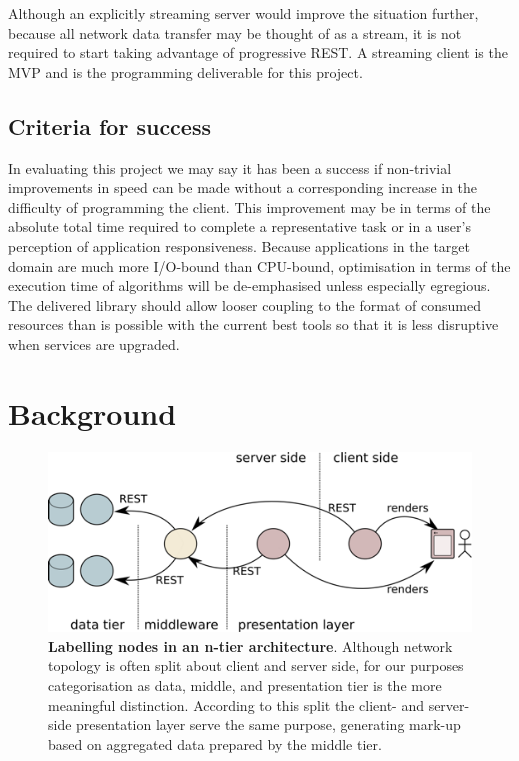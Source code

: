 \documentclass[12pt, ]{article}
\makeatletter
\let\stdsection\section
\renewcommand\section{\newpage\stdsection}
\def\maxwidth{\ifdim\Gin@nat@width>\linewidth\linewidth
\else\Gin@nat@width\fi}
\let\Oldincludegraphics\includegraphics
\renewcommand{\includegraphics}[1]{\Oldincludegraphics[width=\maxwidth]{#1}}
\makeatother
\begin{document}
Although an explicitly streaming server would improve the situation
further, because all network data transfer may be thought of as a
stream, it is not required to start taking advantage of progressive
REST. A streaming client is the MVP and is the programming deliverable
for this project.

\subsection{Criteria for success}\label{criteria-for-success}

In evaluating this project we may say it has been a success if
non-trivial improvements in speed can be made without a corresponding
increase in the difficulty of programming the client. This improvement
may be in terms of the absolute total time required to complete a
representative task or in a user's perception of application
responsiveness. Because applications in the target domain are much more
I/O-bound than CPU-bound, optimisation in terms of the execution time of
algorithms will be de-emphasised unless especially egregious. The
delivered library should allow looser coupling to the format of consumed
resources than is possible with the current best tools so that it is
less disruptive when services are upgraded.

\section{Background}\label{background}

\begin{figure}[htbp]
\centering
\includegraphics{images/architecture.png}
\caption{\textbf{Labelling nodes in an n-tier architecture}. Although
network topology is often split about client and server side, for our
purposes categorisation as data, middle, and presentation tier is the
more meaningful distinction. According to this split the client- and
server-side presentation layer serve the same purpose, generating
mark-up based on aggregated data prepared by the middle tier.
\label{architecture}}
\end{figure}
\end{document}
